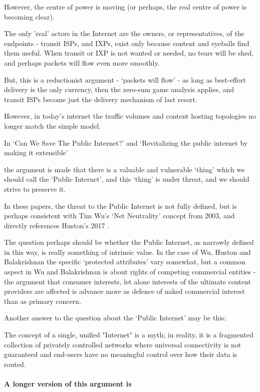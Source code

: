 However, the centre of power is moving (or perhaps, the real centre of power is becoming clear).

The only 'real' actors in the Internet are the owners, or representatives, of the endpoints - transit ISPs, and IXPs, exist only because content and eyeballs find them useful.  When transit or IXP is not wanted or needed, no tears will be shed, and perhaps packets will flow even more smoothly.

But, this is a reductionist argument - `packets will flow' - as long as best-effort delivery is the only currency, then the zero-sum game analysis applies, and transit ISPs become just the delivery mechanism of last resort.

However, in today's internet the traffic volumes and content hosting topologies no longer match the simple model.

In 
`Can We Save The Public Internet?' \cite{blumenthal2024} and `Revitalizing the public internet by making it extensible' \cite{Balakrishnan2021}

the argument is made that there is a valuable and vulnerable `thing' which we should call the `Public Internet', and this `thing' is under threat, and we should strive to preserve it.

In these papers, the threat to the Public Internet is not fully defined, but is perhaps consistent with Tim Wu's `Net Neutrality' \cite{wu2003network} concept from 2003, and directly references Huston's 2017  \cite{Huston}.

The question perhaps should be whether the Public Internet, as narrowly defined in this way, is really something of intrinsic value.
In the case of Wu, Huston and Balakrishnan the specific `protected attributes' vary somewhat, but a common aspect in Wu and Balakrishnan is about rights of competing commercial entities - the argument that consumer interests, let alone interests of the ultimate content providers are affected is advance more as defence of naked commercial interest than as primary concern.

Another answer to the question about the `Public Internet' may be this:

The concept of a single, unified "Internet" is a myth; in reality, it is a fragmented collection of privately controlled networks where universal connectivity is not guaranteed and end-users have no meaningful control over how their data is routed.

\paragraph{A longer version of this argument is}

